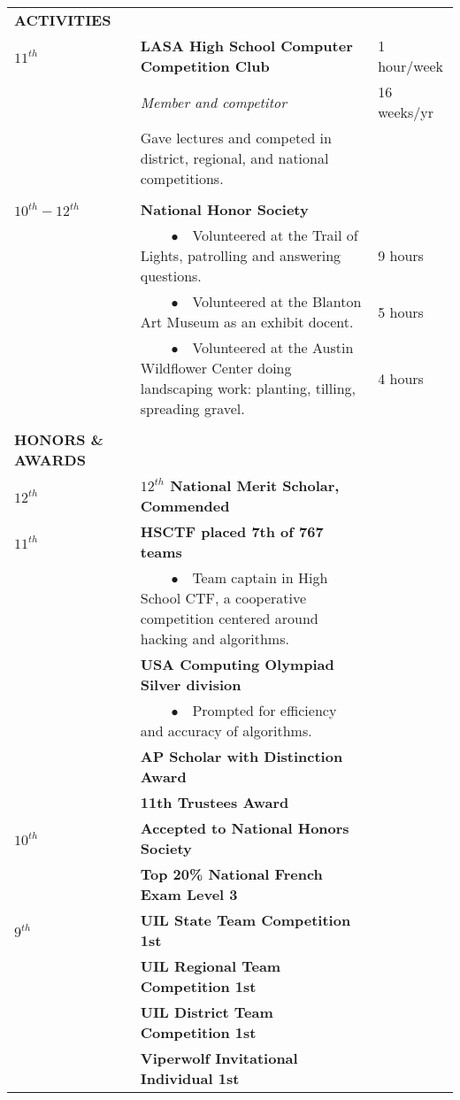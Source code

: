 \documentclass{article}
\begin{document}
	\begin{tabularx}{\textwidth - 20pt}{l X l}
		\textbf{ACTIVITIES} & & \\
		$11^{th}$ & \textbf{LASA High School Computer Competition Club} & 1 hour/week\\
		&  \emph{Member and competitor} & 16 weeks/yr\\
		& Gave lectures and competed in district, regional, and national competitions. & \\
		\\
		$10^{th} - 12^{th}$ & \textbf{National Honor Society}& \\
		& $\qquad \bullet \enspace$ Volunteered at the Trail of Lights, patrolling and answering questions. & 9 hours\\
		& $\qquad \bullet \enspace$ Volunteered at the Blanton Art Museum as an exhibit docent. & 5 hours\\
		& $\qquad \bullet \enspace$ Volunteered at the Austin Wildflower Center doing landscaping work: planting, tilling, spreading gravel. & 4 hours\\
		\\
		\textbf{HONORS \& AWARDS} & & \\
		$12^{th}$ & \textbf{ $12^{th}$ National Merit Scholar, Commended }& \\
		$11^{th}$ & \textbf{ HSCTF placed 7th of 767 teams }& \\
		& $\qquad \bullet \enspace$ Team captain in High School CTF, a cooperative competition centered around hacking and algorithms. & \\
		&  \textbf{ USA Computing Olympiad Silver division}& \\
		& $\qquad \bullet \enspace$ Prompted for efficiency and accuracy of algorithms. & \\
		&  \textbf{ AP Scholar with Distinction Award} & \\
		&  \textbf{ 11th Trustees Award} & \\
		$10^{th}$ &  \textbf{ Accepted to National Honors Society}& \\
		&  \textbf{ Top 20\% National French Exam Level 3} & \\
		$9^{th}$ &  \textbf{ UIL State Team Competition 1st} & \\
		&  \textbf{ UIL Regional Team Competition 1st} & \\
		&  \textbf{ UIL District Team Competition 1st} & \\
		&  \textbf{ Viperwolf Invitational Individual 1st} & \\

\end{tabularx}
\end{document}
